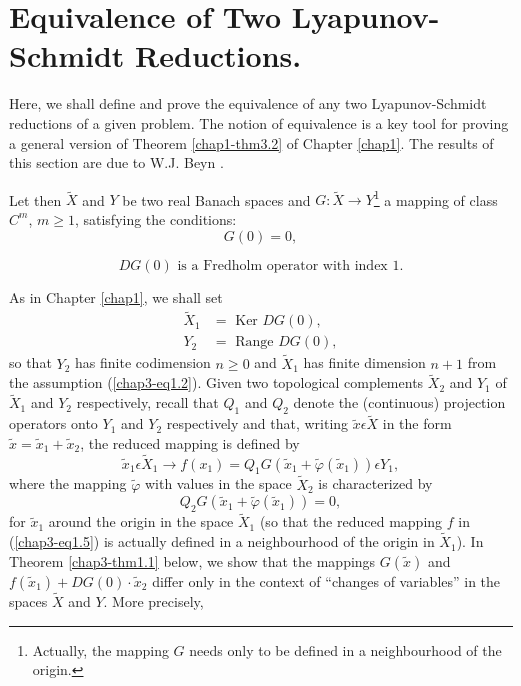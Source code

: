 \section{Equivalence of Two Lyapunov-Schmidt Reductions.}\label{chap3-sec1}

Here, we shall define and prove the equivalence of any two
Lyapunov-Schmidt reductions of a given problem. The notion of
equivalence is a key tool for proving a general version of Theorem
\ref{chap1-thm3.2} of Chapter \ref{chap1}. The results of this section
are due to W.J. Beyn \cite{42}.

Let then $\widetilde{X}$ and $Y$ be two real Banach spaces and $G :
\widetilde{X} \to Y$\footnote{Actually, the mapping $G$ needs only to be
defined in a neighbourhood of the origin.} a mapping of class $C^{m}$,
$m \geq 1$, satisfying the conditions:
\begin{equation*}
G(0) = 0,\tag{1.1}\label{chap3-eq1.1}
\end{equation*}

\begin{equation*}
DG(0) \text{ is a Fredholm operator with index 1.}\tag{1.2}\label{chap3-eq1.2}
\end{equation*}\pageoriginale

As in Chapter \ref{chap1}, we shall set
\begin{align*}
\widetilde{X}_{1} & = \text{ Ker } DG(0),\tag{1.3}\label{chap3-eq1.3}\\
Y_{2} & = \text{ Range } DG(0),\tag{1.4}\label{chap3-eq1.4}
\end{align*}
so that $Y_{2}$ has finite codimension $n \geq 0$ and
$\widetilde{X}_{1}$ has finite dimension $n + 1$ from the assumption
(\ref{chap3-eq1.2}). Given two topological complements
$\widetilde{X}_{2}$ and $Y_{1}$ of $\widetilde{X}_{1}$ and $Y_{2}$
respectively, recall that $Q_{1}$ and $Q_{2}$ denote the (continuous)
projection operators onto $Y_{1}$ and $Y_{2}$ respectively and that,
writing $\widetilde{x} \epsilon \widetilde{X}$ in the form
$\widetilde{x} = \widetilde{x}_{1} + \widetilde{x}_{2}$, the reduced
mapping is defined by
\begin{equation*}
\widetilde{x}_{1} \epsilon \widetilde{X}_{1} \to f(x_{1}) =
Q_{1}G(\widetilde{x}_{1} + \widetilde{\varphi}(\widetilde{x}_{1}))
\epsilon Y_{1},\tag{1.5}\label{chap3-eq1.5}
\end{equation*}
where the mapping $\widetilde{\varphi}$ with values in the space
$\widetilde{X}_{2}$ is characterized by 
\begin{equation*}
Q_{2}G(\widetilde{x}_{1} + \widetilde{\varphi}(\widetilde{x}_{1})) = 0,\tag{1.6}\label{chap3-eq1.6}
\end{equation*}
for $\widetilde{x}_{1}$ around the origin in the space
$\widetilde{X}_{1}$ (so that the reduced mapping $f$ in
(\ref{chap3-eq1.5}) is actually defined in a neighbourhood of the
origin in $\widetilde{X}_{1}$). In Theorem \ref{chap3-thm1.1} below,
we show that the mappings $G(\widetilde{x})$ and $f(\widetilde{x}_{1})
+ DG(0) \cdot \widetilde{x}_{2}$ differ only in the context of
``changes of variables'' in the spaces $\widetilde{X}$ and $Y$. More
precisely,


